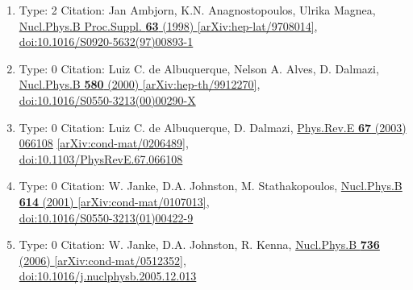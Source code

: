 \documentclass[a4paper,10pt]{article}
\begin{document}
\begin{enumerate}
\begin{enumerate}
  \item Type: 2 Citation: Jan Ambjorn, K.N. Anagnostopoulos, Ulrika Magnea, \href{https://www.doi.org/10.1016/S0920-5632(97)00893-1}{Nucl.Phys.B Proc.Suppl. {\bf 63} (1998) }  \href{https://arxiv.org/abs/hep-lat/9708014}{[arXiv:hep-lat/9708014]},\\\href{https://www.doi.org/10.1016/S0920-5632(97)00893-1}{doi:10.1016/S0920-5632(97)00893-1}
  \item Type: 0 Citation: Luiz C. de Albuquerque, Nelson A. Alves, D. Dalmazi, \href{https://www.doi.org/10.1016/S0550-3213(00)00290-X}{Nucl.Phys.B {\bf 580} (2000) }  \href{https://arxiv.org/abs/hep-th/9912270}{[arXiv:hep-th/9912270]},\\\href{https://www.doi.org/10.1016/S0550-3213(00)00290-X}{doi:10.1016/S0550-3213(00)00290-X}
  \item Type: 0 Citation: Luiz C. de Albuquerque, D. Dalmazi, \href{https://www.doi.org/10.1103/PhysRevE.67.066108}{Phys.Rev.E {\bf 67} (2003) 066108}  \href{https://arxiv.org/abs/cond-mat/0206489}{[arXiv:cond-mat/0206489]},\\\href{https://www.doi.org/10.1103/PhysRevE.67.066108}{doi:10.1103/PhysRevE.67.066108}
  \item Type: 0 Citation: W. Janke, D.A. Johnston, M. Stathakopoulos, \href{https://www.doi.org/10.1016/S0550-3213(01)00422-9}{Nucl.Phys.B {\bf 614} (2001) }  \href{https://arxiv.org/abs/cond-mat/0107013}{[arXiv:cond-mat/0107013]},\\\href{https://www.doi.org/10.1016/S0550-3213(01)00422-9}{doi:10.1016/S0550-3213(01)00422-9}
  \item Type: 0 Citation: W. Janke, D.A. Johnston, R. Kenna, \href{https://www.doi.org/10.1016/j.nuclphysb.2005.12.013}{Nucl.Phys.B {\bf 736} (2006) }  \href{https://arxiv.org/abs/cond-mat/0512352}{[arXiv:cond-mat/0512352]},\\\href{https://www.doi.org/10.1016/j.nuclphysb.2005.12.013}{doi:10.1016/j.nuclphysb.2005.12.013}

\end{enumerate}
\end{enumerate}
\end{document}
